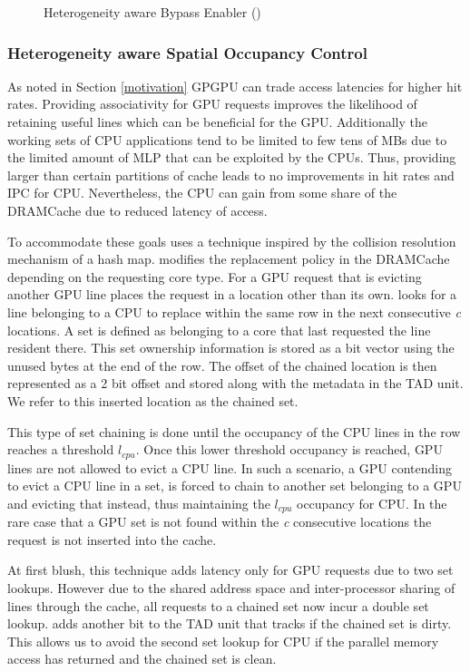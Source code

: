 \begin{figure}[htb]
    \centering
    \bloom
    \caption{Heterogeneity aware Bypass Enabler (\bypassname)}
    \label{fig:chain-access}
\end{figure}

\subsubsection{Heterogeneity aware Spatial Occupancy Control}
As noted in Section \ref{motivation} GPGPU can trade access latencies for higher hit rates. Providing associativity for GPU requests improves the likelihood of retaining useful lines which can be beneficial for the GPU. Additionally the working sets of CPU applications tend to be limited to few tens of MBs due to the limited amount of MLP that can be exploited by the CPUs. Thus, providing larger than certain partitions of cache leads to no improvements in hit rates and IPC for CPU. Nevertheless, the CPU can gain from some share of the DRAMCache due to reduced latency of access.
\par To accommodate these goals \cachename uses a technique inspired by the collision resolution mechanism of a hash map. \cachename modifies the replacement policy in the DRAMCache depending on the requesting core type. For a GPU request that is evicting another GPU line \cachename places the request in a location other than its own. \cachename looks for a line belonging to a CPU to replace within the same row in the next consecutive \textit{c} locations. A set is defined as belonging to a core that last requested the line resident there. This set ownership information is stored as a bit vector using the unused bytes at the end of the row. The offset of the chained location is then represented as a 2 bit offset and stored along with the metadata in the TAD unit. We refer to this inserted location as the chained set. 
\par This type of set chaining is done until the occupancy of the CPU lines in the row reaches a threshold \textit{$l_{cpu}$}. Once this lower threshold occupancy is reached, GPU lines are not allowed to evict a CPU line. In such a scenario, a GPU contending to evict a CPU line in a set, is forced to chain to another set belonging to a GPU and evicting that instead, thus maintaining the \textit{$l_{cpu}$} occupancy for CPU. 
In the rare case that a GPU set is not found within the \textit{c} consecutive locations the request is not inserted into the cache.
\par At first blush, this technique adds latency only for GPU requests due to two set lookups. However due to the shared address space and inter-processor sharing of lines through the cache, all requests to a chained set now incur a double set lookup. \cachename adds another bit to the TAD unit that tracks if the chained set is dirty. This allows us to avoid the second set lookup for CPU if the parallel memory access has returned and the chained set is clean. 
